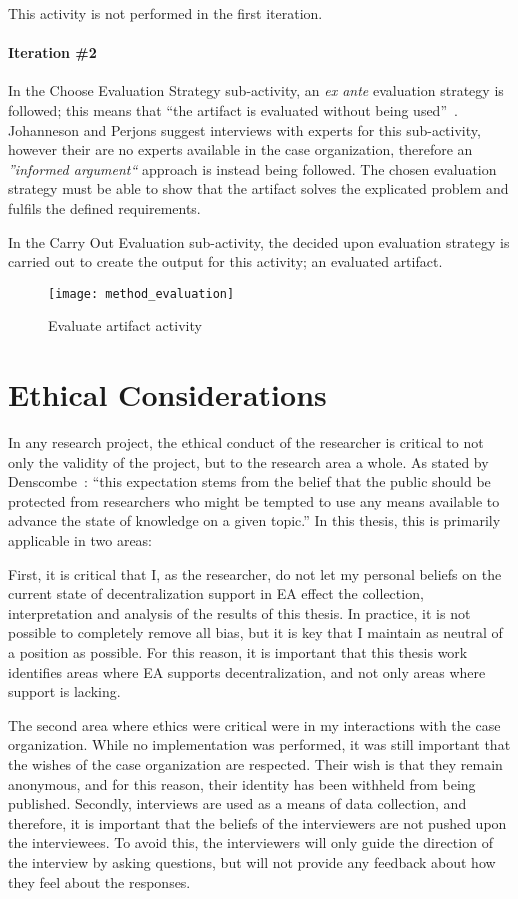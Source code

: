 This activity is not performed in the first iteration. 

\paragraph{Iteration \#2}

In the Choose Evaluation Strategy sub-activity, an \textit{ex ante} evaluation strategy is followed; this means that ``the artifact is evaluated without being used''~\cite[Ch. 9.1]{johannessonPerjons2012}. Johanneson and Perjons suggest interviews with experts for this sub-activity, however their are no experts available in the case organization, therefore an \textit{''informed argument``} approach is instead being followed. The chosen evaluation strategy must be able to show that the artifact solves the explicated problem and fulfils the defined requirements.

In the Carry Out Evaluation sub-activity, the decided upon evaluation strategy is carried out to create the output for this activity; an evaluated artifact. 

\begin{figure}
\texttt{[image: method\_evaluation]}
\caption{Evaluate artifact activity}
\label{fig:method_eval}
\end{figure}

\label{sec:ethics}
\section{Ethical Considerations}

In any research project, the ethical conduct of the researcher is critical to not only the validity of the project, but to the research area a whole. As stated by Denscombe~\cite{denscombe2010good}: ``this expectation stems from the belief that the public should be protected from researchers who might be tempted to use any means available to advance the state of knowledge on a given topic.'' In this thesis, this is primarily applicable in two areas:

First, it is critical that I, as the researcher, do not let my personal beliefs on the current state of decentralization support in EA effect the collection, interpretation and analysis of the results of this thesis. In practice, it is not possible to completely remove all bias, but it is key that I maintain as neutral of a position as possible. For this reason, it is important that this thesis work identifies areas where EA supports decentralization, and not only areas where support is lacking. 

The second area where ethics were critical were in my interactions with the case organization. While no implementation was performed, it was still important that the wishes of the case organization are respected. Their wish is that they remain anonymous, and for this reason, their identity has been withheld from being published. Secondly, interviews are used as a means of data collection, and therefore, it is important that the beliefs of the interviewers are not pushed upon the interviewees. To avoid this, the interviewers will only guide the direction of the interview by asking questions, but will not provide any feedback about how they feel about the responses. 

